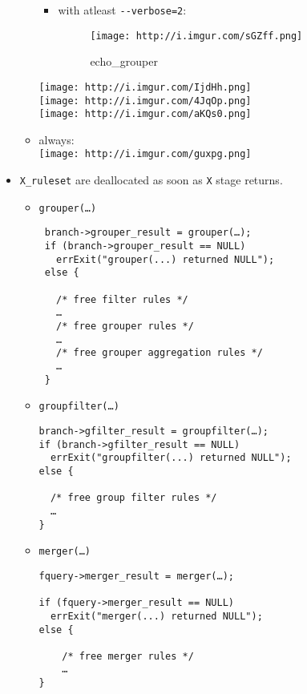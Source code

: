 \begin{itemize}
\begin{itemize}
    \begin{itemize}
    \item
      with atleast \lstinline!--verbose=2!:

      \begin{figure}[htbp]
      \centering
      \texttt{[image: http://i.imgur.com/sGZff.png]}
      \caption{echo\_grouper}
      \end{figure}
    \end{itemize}

    \texttt{[image: http://i.imgur.com/IjdHh.png]}\\\texttt{[image: http://i.imgur.com/4JqOp.png]}\\\texttt{[image: http://i.imgur.com/aKQs0.png]}
  \item
    always:\\ \texttt{[image: http://i.imgur.com/guxpg.png]}
  \end{itemize}
\item
  \lstinline!X_ruleset! are deallocated as soon as \lstinline!X! stage
  returns.

  \begin{itemize}
  \item
    \lstinline!grouper(…)!

\begin{lstlisting}
 branch->grouper_result = grouper(…); 
 if (branch->grouper_result == NULL)
   errExit("grouper(...) returned NULL");
 else {

   /* free filter rules */
   …        
   /* free grouper rules */
   …                        
   /* free grouper aggregation rules */
   …            
 }  
\end{lstlisting}
  \item
    \lstinline!groupfilter(…)!

\begin{lstlisting}
branch->gfilter_result = groupfilter(…);
if (branch->gfilter_result == NULL)
  errExit("groupfilter(...) returned NULL");
else {

  /* free group filter rules */
  …
}
\end{lstlisting}
  \item
    \lstinline!merger(…)!

\begin{lstlisting}
fquery->merger_result = merger(…); 

if (fquery->merger_result == NULL)
  errExit("merger(...) returned NULL");
else {

    /* free merger rules */ 
    … 
}    
\end{lstlisting}
  \end{itemize}
\end{itemize}

